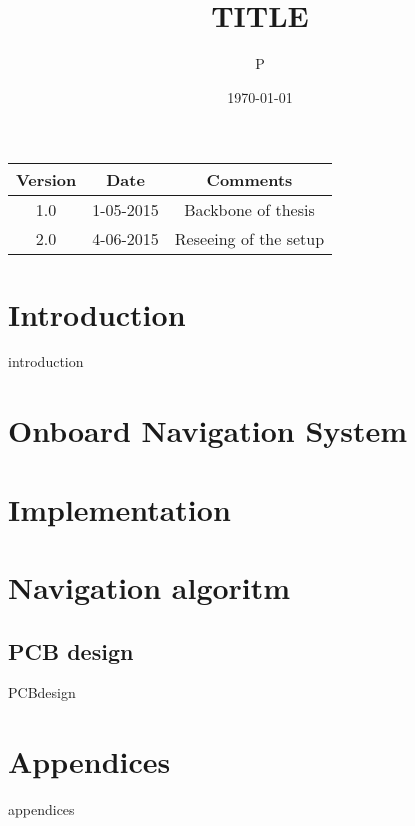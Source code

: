 \documentclass[parskip=full,11pt,a4paper,titlepage]{article}
\title{TITLE}
\author{P}
\date{\today}
\begin{document}



\clearpage

\begin{center}
\begin{tabular}{|c|c|c|}
\hline
	Version	& Date & Comments \\
\hline
	1.0		& 1-05-2015	 & Backbone of thesis \\
	2.0		& 4-06-2015	 & Reseeing of the setup\\
\hline
\end{tabular}
\end{center}
\clearpage


\tableofcontents
\clearpage

\section{Introduction}
{introduction}
\clearpage

\section{Onboard Navigation System}
\section{Implementation}
\section{Navigation algoritm}

\subsection{PCB design}
{PCBdesign}
\clearpage

\section{Appendices}
{appendices}
\clearpage









\end{document}
